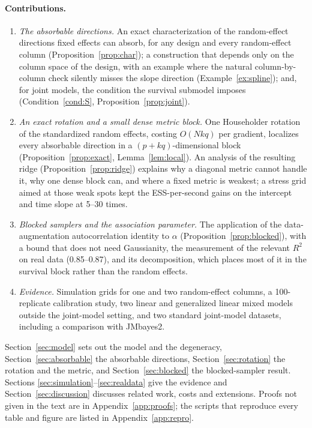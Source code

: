 \paragraph{Contributions.}
\begin{enumerate}
\item \emph{The absorbable directions.} An exact characterization of the
random-effect directions fixed effects can absorb, for any design and every
random-effect column (Proposition~\ref{prop:char}); a construction that
depends only on the column space of the design, with an example where the
natural column-by-column check silently misses the slope direction
(Example~\ref{ex:spline}); and, for joint models, the condition the
survival submodel imposes (Condition~\ref{cond:S},
Proposition~\ref{prop:joint}).
\item \emph{An exact rotation and a small dense metric block.} One
Householder rotation of the standardized random effects, costing $O(Nkq)$
per gradient, localizes every absorbable direction in a $(p + kq)$-dimensional
block (Proposition~\ref{prop:exact}, Lemma~\ref{lem:local}). An analysis of
the resulting ridge (Proposition~\ref{prop:ridge}) explains why a diagonal
metric cannot handle it, why one dense block can, and where a fixed metric
is weakest; a stress grid aimed at those weak spots kept the ESS-per-second gains on the intercept and time slope at 5--30 times.
\item \emph{Blocked samplers and the association parameter.} The
application of the data-augmentation autocorrelation identity to
$\alpha$ (Proposition~\ref{prop:blocked}), with a bound that does not
need Gaussianity, the measurement of the relevant $R^2$ on real data
(0.85--0.87), and its decomposition, which
places most of it in the survival block rather than the random effects.
\item \emph{Evidence.} Simulation grids for one and two random-effect
columns, a 100-replicate calibration study, two linear and generalized
linear mixed models outside the joint-model setting, and two standard
joint-model datasets, including a comparison with JMbayes2.
\end{enumerate}

Section~\ref{sec:model} sets out the model and the degeneracy,
Section~\ref{sec:absorbable} the absorbable directions,
Section~\ref{sec:rotation} the rotation and the metric, and
Section~\ref{sec:blocked} the blocked-sampler result. Sections
\ref{sec:simulation}--\ref{sec:realdata} give the evidence and
Section~\ref{sec:discussion} discusses related work, costs and extensions.
Proofs not given in the text are in Appendix~\ref{app:proofs}; the scripts
that reproduce every table and figure are listed in
Appendix~\ref{app:repro}.
